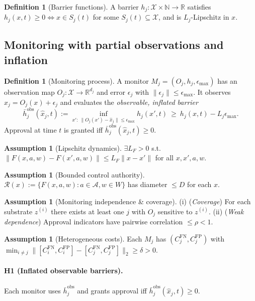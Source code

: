 \documentclass[11pt]{article}
\theoremstyle{definition}
\newtheorem{definition}[theorem]{Definition}
\newtheorem{assumption}[theorem]{Assumption}
\newcommand{\X}{\mathcal{X}}
\newcommand{\A}{\mathcal{A}}
\newcommand{\R}{\mathbb{R}}
\begin{document}
\begin{definition}[Barrier functions]\label{def:barrier}
A barrier $h_j:\X\times\mathbb N\to\R$ satisfies $h_j(x,t)\ge 0 \iff x\in S_j(t)$ for some $S_j(t)\subseteq\X$, and is $L_j$-Lipschitz in $x$.
\end{definition}

\subsection{Monitoring with partial observations and inflation}
\begin{definition}[Monitoring process]\label{def:monitor}
A monitor $M_j=(O_j,h_j,\epsilon_{\max})$ has an observation map $O_j:\X\to\R^{d_j}$ and error $\epsilon_j$ with $\|\epsilon_j\|\le \epsilon_{\max}$. It observes $\hat x_j=O_j(x)+\epsilon_j$ and evaluates the \emph{observable, inflated barrier}
\[
\bar h^{\mathrm{obs}}_j(\hat x_j,t):=\inf_{x':\ \|O_j(x')-\hat x_j\|\le \epsilon_{\max}} h_j(x',t)\ \ge\ h_j(x,t)-L_j\epsilon_{\max}.
\]
Approval at time $t$ is granted iff $\bar h^{\mathrm{obs}}_j(\hat x_j,t)\ge 0$.
\end{definition}

\begin{assumption}[Lipschitz dynamics]\label{ass:lipsF}
$\exists L_F>0$ s.t. $\|F(x,a,w)-F(x',a,w)\|\le L_F\|x-x'\|$ for all $x,x',a,w$.
\end{assumption}
\begin{assumption}[Bounded control authority]\label{ass:authority}
$\mathcal R(x):=\{F(x,a,w):a\in\A,w\in W\}$ has diameter $\le D$ for each $x$.
\end{assumption}
\begin{assumption}[Monitoring independence \& coverage]\label{ass:indep}
(i) (\emph{Coverage}) For each substrate $z^{(i)}$ there exists at least one $j$ with $O_j$ sensitive to $z^{(i)}$. (ii) (\emph{Weak dependence}) Approval indicators have pairwise correlation $\le \rho<1$.
\end{assumption}
\begin{assumption}[Heterogeneous costs]\label{ass:hetero}
Each $M_j$ has $(C_j^{\mathrm{FN}},C_j^{\mathrm{FP}})$ with $\min_{i\neq j}\|[C_i^{\mathrm{FN}},C_i^{\mathrm{FP}}]-[C_j^{\mathrm{FN}},C_j^{\mathrm{FP}}]\|_2\ge \delta>0$.
\end{assumption}

\paragraph{H1 (Inflated observable barriers).}
Each monitor uses $\bar h^{\mathrm{obs}}_j$ and grants approval iff $\bar h^{\mathrm{obs}}_j(\hat x_j,t)\ge 0$.
\end{document}
